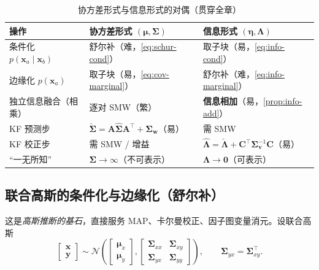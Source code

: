 \begin{table}[H]\centering\small
\caption{协方差形式与信息形式的对偶（贯穿全章）}
\label{tab:cov-info}
\begin{tabular}{lll}
\toprule
操作 & 协方差形式 $(\boldsymbol{\mu},\boldsymbol{\Sigma})$ & 信息形式 $(\boldsymbol{\eta},\boldsymbol{\Lambda})$ \\
\midrule
条件化 $p(\mathbf{x}_a\mid\mathbf{x}_b)$ & 舒尔补（难，\cref{eq:schur-cond}） & 取子块（易，\cref{eq:info-cond}） \\
边缘化 $p(\mathbf{x}_a)$ & 取子块（易，\cref{eq:cov-marginal}） & 舒尔补（难，\cref{eq:info-marginal}） \\
独立信息融合（相乘） & 逐对 SMW（繁） & \textbf{信息相加}（易，\cref{prop:info-add}） \\
KF 预测步 & $\check{\boldsymbol{\Sigma}}=\mathbf{A}\hat{\boldsymbol{\Sigma}}\mathbf{A}^\top+\boldsymbol{\Sigma}_{\mathbf{w}}$（易） & 需 SMW \\
KF 校正步 & 需 SMW / 增益 & $\hat{\boldsymbol{\Lambda}}=\check{\boldsymbol{\Lambda}}+\mathbf{C}^\top\boldsymbol{\Sigma}_{\mathbf{v}}^{-1}\mathbf{C}$（易） \\
“一无所知” & $\boldsymbol{\Sigma}\to\infty$（不可表示） & $\boldsymbol{\Lambda}\to\mathbf{0}$（可表示） \\
\bottomrule
\end{tabular}
\end{table}

\subsection{联合高斯的条件化与边缘化（舒尔补）}
\label{sec:est-gauss-cond}

这是\emph{高斯推断的基石}，直接服务 MAP、卡尔曼校正、因子图变量消元。设联合高斯
\begin{equation}
  \begin{bmatrix}\mathbf{x}\\\mathbf{y}\end{bmatrix}\sim
  \mathcal{N}\!\left(\begin{bmatrix}\boldsymbol{\mu}_x\\\boldsymbol{\mu}_y\end{bmatrix},
  \begin{bmatrix}\boldsymbol{\Sigma}_{xx}&\boldsymbol{\Sigma}_{xy}\\\boldsymbol{\Sigma}_{yx}&\boldsymbol{\Sigma}_{yy}\end{bmatrix}\right),
  \qquad \boldsymbol{\Sigma}_{yx}=\boldsymbol{\Sigma}_{xy}^\top.
  \label{eq:joint-gauss}
\end{equation}


